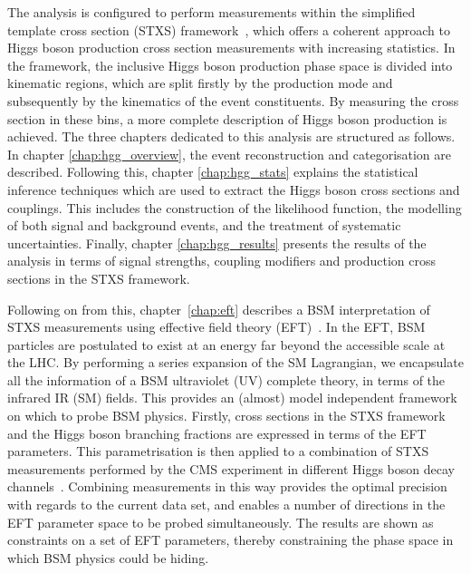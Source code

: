 The \Hgg analysis is configured to perform measurements within the simplified template cross section (STXS) framework~\cite{deFlorian:2016spz}, which offers a coherent approach to Higgs boson production cross section measurements with increasing statistics. In the framework, the inclusive Higgs boson production phase space is divided into kinematic regions, which are split firstly by the production mode and subsequently by the kinematics of the event constituents. By measuring the cross section in these bins, a more complete description of Higgs boson production is achieved. The three chapters dedicated to this analysis are structured as follows. In chapter \ref{chap:hgg_overview}, the event reconstruction and categorisation are described. Following this, chapter \ref{chap:hgg_stats} explains the statistical inference techniques which are used to extract the Higgs boson cross sections and couplings. This includes the construction of the likelihood function, the modelling of both signal and background events, and the treatment of systematic uncertainties. Finally, chapter \ref{chap:hgg_results} presents the results of the analysis in terms of signal strengths, coupling modifiers and production cross sections in the STXS framework.

Following on from this, chapter~\ref{chap:eft} describes a BSM interpretation of STXS measurements using effective field theory (EFT)~\cite{BUCHMULLER1986621,Hagiwara:1993qt,Giudice_2007,Grzadkowski2010,Contino:2013kra}. In the EFT, BSM particles are postulated to exist at an energy far beyond the accessible scale at the LHC. By performing a series expansion of the SM Lagrangian, we encapsulate all the information of a BSM ultraviolet (UV) complete theory, in terms of the infrared IR (SM) fields. This provides an (almost) model independent framework on which to probe BSM physics. Firstly, cross sections in the STXS framework and the Higgs boson branching fractions are expressed in terms of the EFT parameters. This parametrisation is then applied to a combination of STXS measurements performed by the CMS experiment in different Higgs boson decay channels~\cite{CMS-PAS-HIG-19-005}. Combining measurements in this way provides the optimal precision with regards to the current data set, and enables a number of directions in the EFT parameter space to be probed simultaneously. The results are shown as constraints on a set of EFT parameters, thereby constraining the phase space in which BSM physics could be hiding.

